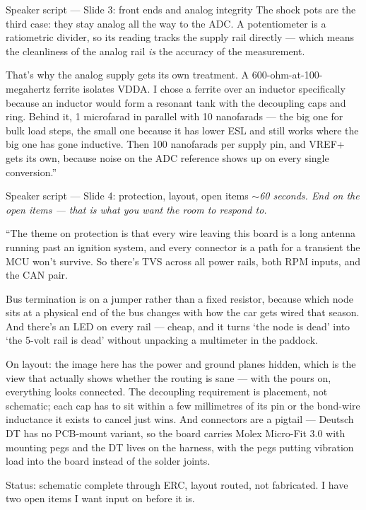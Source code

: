 \documentclass[aspectratio=169,11pt]{beamer}
\begin{document}
{\begin{frame}{Speaker script --- Slide 3: front ends and analog integrity}
The shock pots are the third case: they stay analog all the way to the ADC. A
potentiometer is a ratiometric divider, so its reading tracks the supply rail
directly --- which means the cleanliness of the analog rail \emph{is} the accuracy of
the measurement.

That's why the analog supply gets its own treatment. A 600-ohm-at-100-megahertz
ferrite isolates VDDA. I chose a ferrite over an inductor specifically because an
inductor would form a resonant tank with the decoupling caps and ring. Behind it,
1 microfarad in parallel with 10 nanofarads --- the big one for bulk load steps, the
small one because it has lower ESL and still works where the big one has gone
inductive. Then 100 nanofarads per supply pin, and VREF+ gets its own, because noise
on the ADC reference shows up on every single conversion.''
\end{frame}

\begin{frame}{Speaker script --- Slide 4: protection, layout, open items}
\scriptsize
\textit{\color{dim}$\sim$60 seconds. End on the open items --- that is what you want the
room to respond to.}
\medskip

``The theme on protection is that every wire leaving this board is a long antenna
running past an ignition system, and every connector is a path for a transient the
MCU won't survive. So there's TVS across all power rails, both RPM inputs, and the
CAN pair.

Bus termination is on a jumper rather than a fixed resistor, because which node sits
at a physical end of the bus changes with how the car gets wired that season. And
there's an LED on every rail --- cheap, and it turns `the node is dead' into `the
5-volt rail is dead' without unpacking a multimeter in the paddock.

On layout: the image here has the power and ground planes hidden, which is the view
that actually shows whether the routing is sane --- with the pours on, everything
looks connected. The decoupling requirement is placement, not schematic; each cap
has to sit within a few millimetres of its pin or the bond-wire inductance it exists
to cancel just wins. And connectors are a pigtail --- Deutsch DT has no PCB-mount
variant, so the board carries Molex Micro-Fit 3.0 with mounting pegs and the DT
lives on the harness, with the pegs putting vibration load into the board instead of
the solder joints.

Status: schematic complete through ERC, layout routed, not fabricated. I have two
open items I want input on before it is.


\end{frame}}
\end{document}
